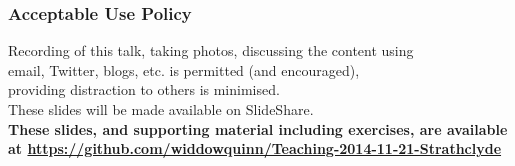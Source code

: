 
%
\begin{frame}
  \frametitle{Acceptable Use Policy}
  Recording of this talk, taking photos, discussing the content using \\
  email, Twitter, blogs, etc. is permitted (and encouraged), \\
  providing distraction to others is minimised. \\[0.5cm]
  These slides will be made available on SlideShare. \\[0.5cm]
  \textbf{These slides, and supporting material including exercises, are available at \href{https://github.com/widdowquinn/Teaching-2014-11-21-Strathclyde}{https://github.com/widdowquinn/Teaching-2014-11-21-Strathclyde}}
\end{frame}